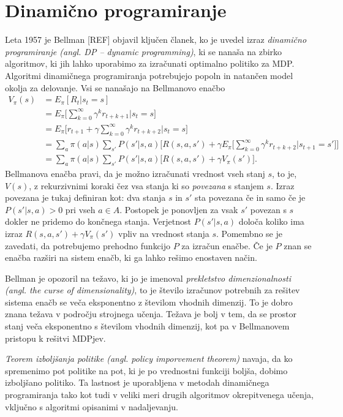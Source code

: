 \documentclass[a4paper, oneside, 12pt]{report}
\begin{document}
\section{Dinamično programiranje}
Leta 1957 je Bellman [REF] objavil ključen članek, ko je uvedel izraz {\em dinamično programiranje (angl. DP -- dynamic programming)}, ki se nanaša na zbirko algoritmov, ki jih lahko uporabimo za izračunati optimalno politiko za MDP. Algoritmi dinamičnega programiranja potrebujejo popoln in natančen model okolja za delovanje. Vsi se nanašajo na Bellmanovo enačbo
\begin{equation}
\begin{aligned}
V_\pi(s) &= E_\pi[R_t | s_t = s]
\\ &= E_\pi\Bigg[\sum_{k=0}^\infty \gamma^k r_{t+k+1} \Bigg| s_t = s\Bigg]
\\ &= E_\pi\Bigg[r_{t+1} + \gamma \sum_{k=0}^\infty \gamma^k r_{t+k+2} \Bigg| s_t = s \Bigg]
\\ &= \sum_a \pi(a | s) \sum_{s'} P(s' | s, a) \Bigg[R(s, a, s') + \gamma E_\pi\Bigg[\sum_{k=0}^\infty \gamma^k r_{t+k+2} \Bigg| s_{t+1} = s' \Bigg]\Bigg]
\\ &= \sum_a \pi(a | s) \sum_{s'} P(s' | s, a) \Big[R(s, a, s') + \gamma V_\pi(s')\Big].
\end{aligned}
\end{equation}
Bellmanova enačba pravi, da je možno izračunati vrednost vseh stanj $s$, to je, $V(s)$, z rekurzivnimi koraki čez vsa stanja ki so {\em povezana} s stanjem $s$. Izraz povezana je tukaj definiran kot: dva stanja $s$ in $s'$ sta povezana če in samo če je $P(s' | s, a) > 0$ pri vseh $a \in A$. Postopek je ponovljen za vsak $s'$ povezan s $s$ dokler ne pridemo do končnega stanja. Verjetnost $P(s' | s, a)$ določa koliko ima izraz $R(s, a, s') + \gamma V_\pi(s')$ vpliv na vrednost stanja $s$. Pomembno se je zavedati, da potrebujemo prehodno funkcijo $P$ za izračun enačbe. Če je $P$ znan se enačba razširi na sistem enačb, ki ga lahko rešimo enostaven način.

Bellman je opozoril na težavo, ki jo je imenoval {\em prekletstvo dimenzionalnosti (angl. the curse of dimensionality)}, to je število izračunov potrebnih za rešitev sistema enačb se veča eksponentno z številom vhodnih dimenzij. To je dobro znana težava v področju strojnega učenja. Težava je bolj v tem, da se prostor stanj veča eksponentno s številom vhodnih dimenzij, kot pa v Bellmanovem pristopu k rešitvi MDPjev.

{\em Teorem izboljšanja politike (angl. policy imporvement theorem)} navaja, da ko spremenimo pot politike na pot, ki je po vrednostni funkciji boljša, dobimo izboljšano politiko. Ta lastnost je uporabljena v metodah dinamičnega programiranja tako kot tudi v veliki meri drugih algoritmov okrepitvenega učenja, vključno s algoritmi opisanimi v nadaljevanju.
\end{document}

